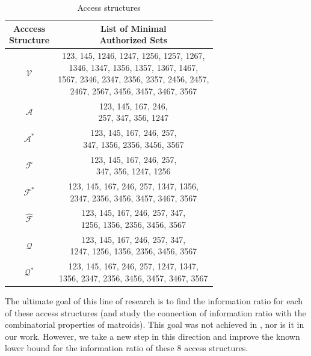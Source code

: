 \documentclass[11pt, a4paper]{kybernetika}
\begin{document}
	\begin{table}[ht]
		\centering
		\begin{tabular}{ |c|c| }
			\hline
			\thead{Acccess\\Structure} & \thead{List of Minimal\\Authorized Sets} \\
			\hline
			$\mathcal{V}$ & \makecell{123, 145, 1246, 1247, 1256, 1257, 1267,\\1346, 1347, 1356, 1357, 1367, 1467,\\ 1567, 2346, 2347, 2356, 2357, 2456, 2457,\\2467, 2567, 3456, 3457, 3467, 3567} \\
			\hline
			$\mathcal{A}$ & \makecell{123, 145, 167, 246,\\ 257, 347, 356, 1247} \\
			\hline
			$\mathcal{A}^*$ & \makecell{123, 145, 167, 246, 257,\\ 347, 1356, 2356, 3456, 3567} \\
			\hline
			$\mathcal{F}$ & \makecell{123, 145, 167, 246, 257,\\ 347, 356, 1247, 1256} \\
			\hline
			$\mathcal{F}^*$ & \makecell{123, 145, 167, 246, 257, 1347, 1356,\\ 2347, 2356, 3456, 3457, 3467, 3567} \\
			\hline
			$\widehat{\mathcal{F}}$ & \makecell{123, 145, 167, 246, 257, 347,\\ 1256, 1356, 2356, 3456, 3567} \\
			\hline
			$\mathcal{Q}$ & \makecell{123, 145, 167, 246, 257, 347,\\ 1247, 1256, 1356, 2356, 3456, 3567} \\
			\hline
			$\mathcal{Q}^*$ & \makecell{123, 145, 167, 246, 257, 1247, 1347,\\ 1356, 2347, 2356, 3456, 3457, 3467, 3567} \\
			\hline
		\end{tabular}
		\caption{Access structures}\label{table:acc_str_stu}
	\end{table}
	
	The ultimate goal of this line of research is to find the information ratio for each of these access structures (and study the connection of information ratio with the combinatorial properties of matroids). This goal was not achieved in \cite{farras2020improving}, nor is it in our work. However, we take a new step in this direction and improve the known lower bound for the information ratio of these 8 access structures.
	
\end{document}

